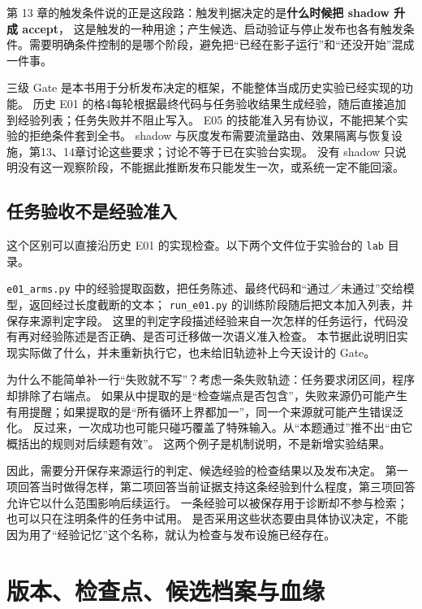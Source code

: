 第 13 章的触发条件说的正是这段路：触发判据决定的是\textbf{什么时候把 shadow 升成 accept}，
这是触发的一种用途；产生候选、启动验证与停止发布也各有触发条件。需要明确条件控制的是哪个阶段，避免把“已经在影子运行”和“还没开始”混成一件事。

\begin{sloppypar}
三级 Gate 是本书用于分析发布决定的框架，不能整体当成历史实验已经实现的功能。
历史 E01 的格4每轮根据最终代码与任务验收结果生成经验，随后直接追加到经验列表；任务失败并不阻止写入。
E05 的技能准入另有协议，不能把某个实验的拒绝条件套到全书。
shadow 与灰度发布需要流量路由、效果隔离与恢复设施，第13、14章讨论这些要求；讨论不等于已在实验台实现。
没有 shadow 只说明没有这一观察阶段，不能据此推断发布只能发生一次，或系统一定不能回滚。
\end{sloppypar}

\subsection{任务验收不是经验准入}
\label{sec:ch02-source-verdict-admission}

这个区别可以直接沿历史 E01 的实现检查。以下两个文件位于实验台的 \texttt{lab} 目录。

\begin{sloppypar}
\texttt{e01\_arms.py} 中的经验提取函数，把任务陈述、最终代码和“通过／未通过”交给模型，返回经过长度截断的文本；
\texttt{run\_e01.py} 的训练阶段随后把文本加入列表，并保存来源判定字段。
这里的判定字段描述经验来自一次怎样的任务运行，代码没有再对经验陈述是否正确、是否可迁移做一次语义准入检查。
本节据此说明旧实现实际做了什么，并未重新执行它，也未给旧轨迹补上今天设计的 Gate。
\end{sloppypar}

为什么不能简单补一行“失败就不写”？考虑一条失败轨迹：任务要求闭区间，程序却排除了右端点。
如果从中提取的是“检查端点是否包含”，失败来源仍可能产生有用提醒；如果提取的是“所有循环上界都加一”，同一个来源就可能产生错误泛化。
反过来，一次成功也可能只碰巧覆盖了特殊输入。从“本题通过”推不出“由它概括出的规则对后续题有效”。
这两个例子是机制说明，不是新增实验结果。

因此，需要分开保存来源运行的判定、候选经验的检查结果以及发布决定。
第一项回答当时做得怎样，第二项回答当前证据支持这条经验到什么程度，第三项回答允许它以什么范围影响后续运行。
一条经验可以被保存用于诊断却不参与检索；也可以只在注明条件的任务中试用。
是否采用这些状态要由具体协议决定，不能因为用了“经验记忆”这个名称，就认为检查与发布设施已经存在。

\section{版本、检查点、候选档案与血缘}
\label{sec:ch02-lineage}

